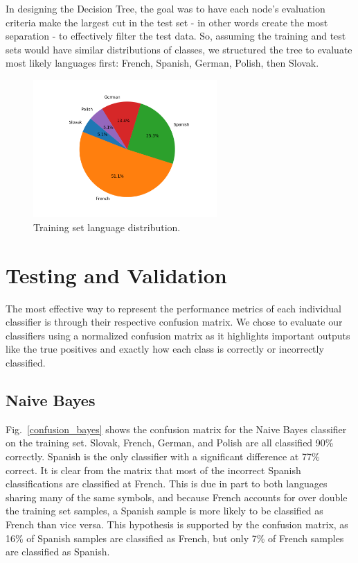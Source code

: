 \documentclass[conference]{IEEEtran}
\begin{document}
In designing the Decision Tree, the goal was to have each node's evaluation criteria make the largest cut in the test set - in other words create the most separation - to effectively filter the test data. So, assuming the training and test sets would have similar distributions of classes, we structured the tree to evaluate most likely languages first: French, Spanish, German, Polish, then Slovak.


\begin{figure}[htbp]
\centering
\includegraphics[width=70mm]{class_distribution.png}
\caption{Training set language distribution.}
\label{class_distribution}
\end{figure}


\section{Testing and Validation}
The most effective way to represent the performance metrics of each individual classifier is through their respective confusion matrix. We chose to evaluate our classifiers using a normalized confusion matrix as it highlights important outputs like the true positives and exactly how each class is correctly or incorrectly classified.

\subsection{Naive Bayes}
Fig.~\ref{confusion_bayes} shows the confusion matrix for the Naive Bayes classifier on the training set. Slovak, French, German, and Polish are all classified 90\% correctly. Spanish is the only classifier with a significant difference at 77\% correct. It is clear from the matrix that most of the incorrect Spanish classifications are classified at French. This is due in part to both languages sharing many of the same symbols, and because French accounts for over double the training set samples, a Spanish sample is more likely to be classified as French than vice versa. This hypothesis is supported by the confusion matrix, as 16\% of Spanish samples are classified as French, but only 7\% of French samples are classified as Spanish.
\end{document}
